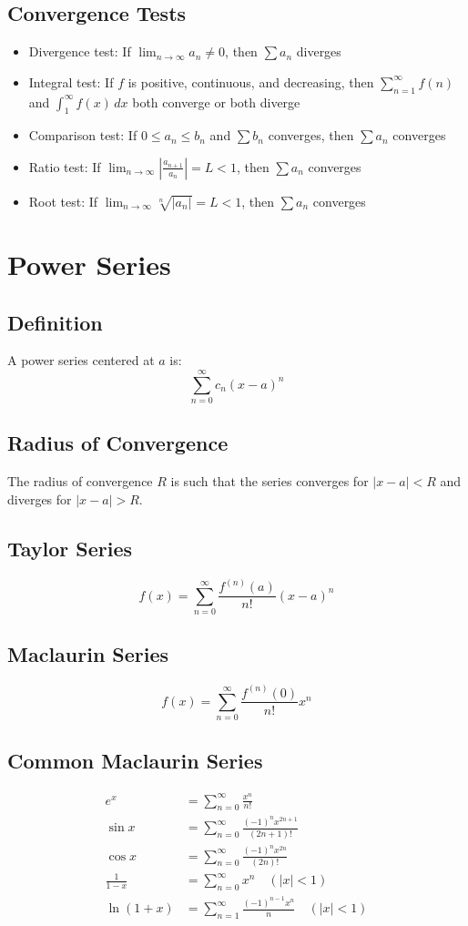 \documentclass[11pt]{article}
\begin{document}
\subsection{Convergence Tests}
\begin{itemize}
    \item Divergence test: If $\lim_{n \to \infty} a_n \neq 0$, then $\sum a_n$ diverges
    \item Integral test: If $f$ is positive, continuous, and decreasing, then $\sum_{n=1}^{\infty} f(n)$ and $\int_1^{\infty} f(x) \, dx$ both converge or both diverge
    \item Comparison test: If $0 \leq a_n \leq b_n$ and $\sum b_n$ converges, then $\sum a_n$ converges
    \item Ratio test: If $\lim_{n \to \infty} \left|\frac{a_{n+1}}{a_n}\right| = L < 1$, then $\sum a_n$ converges
    \item Root test: If $\lim_{n \to \infty} \sqrt[n]{|a_n|} = L < 1$, then $\sum a_n$ converges
\end{itemize}

\section{Power Series}

\subsection{Definition}
A power series centered at $a$ is:
$$\sum_{n=0}^{\infty} c_n(x-a)^n$$

\subsection{Radius of Convergence}
The radius of convergence $R$ is such that the series converges for $|x-a| < R$ and diverges for $|x-a| > R$.

\subsection{Taylor Series}
$$f(x) = \sum_{n=0}^{\infty} \frac{f^{(n)}(a)}{n!}(x-a)^n$$

\subsection{Maclaurin Series}
$$f(x) = \sum_{n=0}^{\infty} \frac{f^{(n)}(0)}{n!}x^n$$

\subsection{Common Maclaurin Series}
\begin{align}
e^x &= \sum_{n=0}^{\infty} \frac{x^n}{n!} \\
\sin x &= \sum_{n=0}^{\infty} \frac{(-1)^n x^{2n+1}}{(2n+1)!} \\
\cos x &= \sum_{n=0}^{\infty} \frac{(-1)^n x^{2n}}{(2n)!} \\
\frac{1}{1-x} &= \sum_{n=0}^{\infty} x^n \quad (|x| < 1) \\
\ln(1+x) &= \sum_{n=1}^{\infty} \frac{(-1)^{n-1} x^n}{n} \quad (|x| < 1)
\end{align}
\end{document}
